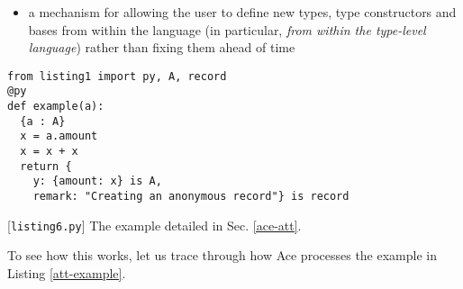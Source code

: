 {\begin{itemize}
\begin{itemize}
  \item a type or type constructor extracted from a subterm
  \item a per-function base semantics (or simply \emph{base}) for forms for which this is not possible  (variables, literals without ascriptions and most statements)
  \end{itemize}
\item a mechanism for allowing the user to define new types, type constructors and bases from within the language (in particular, \emph{from within the type-level language}) rather than fixing them ahead of time
\end{itemize}
\begin{codelisting}
\begin{lstlisting}
from listing1 import py, A, record
@py
def example(a):
  {a : A}
  x = a.amount
  x = x + x
  return {
    y: {amount: x} is A,
    remark: "Creating an anonymous record"} is record
\end{lstlisting}
\caption{[\texttt{listing6.py}] The example detailed in Sec. \ref{ace-att}.}
\label{att-example}
\end{codelisting}

To see how this works, let us trace through how Ace processes the example in Listing \ref{att-example}. 

}
